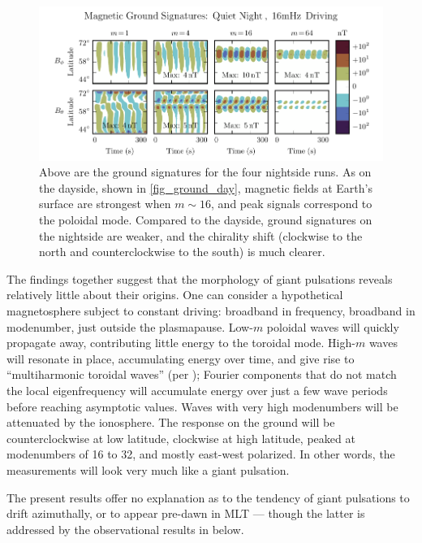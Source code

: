\documentclass[draft,linenumbers]{agujournal}
\begin{document}
\begin{figure}
    \begin{center}
    \includegraphics[width=\textwidth]{figures/fig_ground_night.pdf}
    \caption{
        Above are the ground signatures for the four nightside runs. As on the dayside, shown in \cref{fig_ground_day}, magnetic fields at Earth's surface are strongest when $m \sim 16$, and peak signals correspond to the poloidal mode. Compared to the dayside, ground signatures on the nightside are weaker, and the chirality shift (clockwise to the north and counterclockwise to the south) is much clearer.
    }
    \label{fig_ground_night}
    \end{center}
\end{figure}

The findings together suggest that the morphology of giant pulsations reveals relatively little about their origins. One can consider a hypothetical magnetosphere subject to constant driving: broadband in frequency, broadband in modenumber, just outside the plasmapause. Low-$m$ poloidal waves will quickly propagate away, contributing little energy to the toroidal mode. High-$m$ waves will resonate in place, accumulating energy over time, and give rise to ``multiharmonic toroidal waves'' (per \citet{takahashi_2011}); Fourier components that do not match the local eigenfrequency will accumulate energy over just a few wave periods before reaching asymptotic values. Waves with very high modenumbers will be attenuated by the ionosphere. The response on the ground will be counterclockwise at low latitude, clockwise at high latitude, peaked at modenumbers of 16 to 32, and mostly east-west polarized. In other words, the measurements will look very much like a giant pulsation.

The present results offer no explanation as to the tendency of giant pulsations to drift azimuthally, or to appear pre-dawn in MLT --- though the latter is addressed by the observational results in below.
\end{document}
